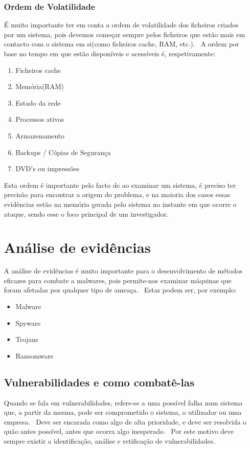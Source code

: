 \documentclass{report}
\begin{document}
\subsubsection{Ordem de Volatilidade}
É muito importante ter em conta a ordem de volatilidade dos ficheiros criados por um sistema, pois devemos começar sempre pelos ficheiros que estão mais em contacto com o sistema em si(como ficheiros cache, RAM, etc.). \ A ordem por base no tempo em que estão disponíveis e acessíveis é, respetivamente:
\begin{enumerate}
    \item Ficheiros cache
    \item Memória(RAM)
    \item Estado da rede
    \item Processos ativos
    \item Armazenamento
    \item Backups / Cópias de Segurança
    \item DVD's ou impressões
\end{enumerate}

Esta ordem é importante pelo facto de ao examinar um sistema, é preciso ter precisão para encontrar a origem do problema, e na maioria dos casos essas evidências estão na memória gerada pelo sistema no instante em que ocorre o ataque, sendo esse o foco principal de um investigador.


\section{Análise de evidências}
\label{sec:analise-de-evidencias}
A análise de evidências é muito importante para o desenvolvimento de métodos eficazes para combate a malwares, pois permite-nos examinar máquinas que foram afetadas por qualquer tipo de ameaça. \ Estas podem ser, por exemplo:
\begin{itemize}
    \item Malware
    \item Spyware
    \item Trojans
    \item Ransomware
\end{itemize}

\subsection{Vulnerabilidades e como combatê-las}
\label{subsec:vulnerabilidades-e-como-combate-las}
Quando se fala em vulnerabilidades, refere-se a uma possível falha num sistema que, a partir da mesma, pode ser comprometido o sistema, o utilizador ou uma empresa. \ Deve ser encarada como algo de alta prioridade, e deve ser resolvida o quão antes possível, antes que ocorra algo inesperado. \ Por este motivo deve sempre existir a identificação, análise e retificação de vulnerabilidades. \bigskip
\end{document}
